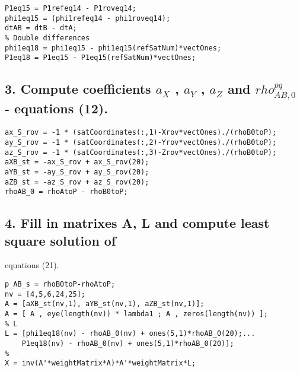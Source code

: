\begin{verbatim}
P1eq15 = P1refeq14 - P1roveq14;
phi1eq15 = (phi1refeq14 - phi1roveq14);
dtAB = dtB - dtA;
% Double differences
phi1eq18 = phi1eq15 - phi1eq15(refSatNum)*vectOnes;
P1eq18 = P1eq15 - P1eq15(refSatNum)*vectOnes;
\end{verbatim}


\subsection*{3. Compute coefficients $a_X$ , $a_Y$ , $a_Z$ and $rho_{AB,0}^{pq}$ - equations (12).}

\begin{verbatim}
ax_S_rov = -1 * (satCoordinates(:,1)-Xrov*vectOnes)./(rhoB0toP);
ay_S_rov = -1 * (satCoordinates(:,2)-Yrov*vectOnes)./(rhoB0toP);
az_S_rov = -1 * (satCoordinates(:,3)-Zrov*vectOnes)./(rhoB0toP);
aXB_st = -ax_S_rov + ax_S_rov(20);
aYB_st = -ay_S_rov + ay_S_rov(20);
aZB_st = -az_S_rov + az_S_rov(20);
rhoAB_0 = rhoAtoP - rhoB0toP;
\end{verbatim}


\subsection*{4. Fill in matrixes A, L and compute least square solution of}

\begin{par}
equations (21).
\end{par} \vspace{1em}
\begin{verbatim}
p_AB_s = rhoB0toP-rhoAtoP;
nv = [4,5,6,24,25];
A = [aXB_st(nv,1), aYB_st(nv,1), aZB_st(nv,1)];
A = [ A , eye(length(nv)) * lambda1 ; A , zeros(length(nv)) ];
% L
L = [phi1eq18(nv) - rhoAB_0(nv) + ones(5,1)*rhoAB_0(20);...
    P1eq18(nv) - rhoAB_0(nv) + ones(5,1)*rhoAB_0(20)];
%
X = inv(A'*weightMatrix*A)*A'*weightMatrix*L;
\end{verbatim}

  

    
